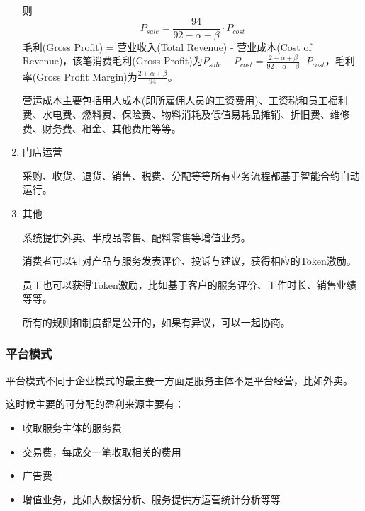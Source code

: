 \documentclass[UTF9]{ctexart}
\begin{document}
\begin{enumerate}
则
\[
	P_{sale} = \frac {94}{92 - \alpha - \beta} \cdot P_{cost} 
\]
毛利(Gross Profit) = 营业收入(Total Revenue) - 营业成本(Cost of Revenue)，该笔消费毛利(Gross Profit)为$P_{sale} - P_{cost} = \frac{2 + \alpha + \beta}{92 - \alpha - \beta} \cdot P_{cost}$，毛利率(Gross Profit Margin)为$\frac{2 + \alpha + \beta}{94}$。

营运成本主要包括用人成本(即所雇佣人员的工资费用)、工资税和员工福利费、水电费、燃料费、保险费、物料消耗及低值易耗品摊销、折旧费、维修费、财务费、租金、其他费用等等。

\item 门店运营

采购、收货、退货、销售、税费、分配等等所有业务流程都基于智能合约自动运行。

\item 其他

系统提供外卖、半成品零售、配料零售等增值业务。

消费者可以针对产品与服务发表评价、投诉与建议，获得相应的Token激励。

员工也可以获得Token激励，比如基于客户的服务评价、工作时长、销售业绩等等。

所有的规则和制度都是公开的，如果有异议，可以一起协商。

\end{enumerate}



\subsubsection{平台模式}

平台模式不同于企业模式的最主要一方面是服务主体不是平台经营，比如外卖。

这时候主要的可分配的盈利来源主要有：

\begin{itemize}
\item 收取服务主体的服务费
\item 交易费，每成交一笔收取相关的费用
\item 广告费
\item 增值业务，比如大数据分析、服务提供方运营统计分析等等
\end{itemize}
\end{document}
